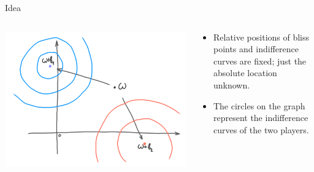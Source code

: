 \documentclass[english,10pt
,aspectratio=169
]{beamer}
\begin{document}
\begin{frame}{Idea}
\begin{columns}
	\begin{column}{0.5\textwidth}
		\begin{center}
			\includegraphics[scale=0.65]{pics/M4/battaglini01.png}
		\end{center}
	\end{column}
	\begin{column}{0.5\textwidth}
		{\small
			\begin{itemize}
				\item Relative positions of bliss points and indifference curves are fixed; just the absolute location unknown.
				\item The circles on the graph represent the indifference curves of the two players.
			\end{itemize}
		}
	\end{column}
\end{columns}
\end{frame}
\end{document}
